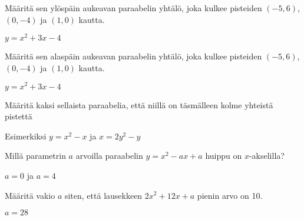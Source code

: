 \begin{tehtavasivu}
\begin{tehtava}
Määritä sen ylöspäin aukeavan paraabelin yhtälö, joka kulkee pisteiden $(-5, 6)$, $(0, -4)$ ja $(1, 0)$ kautta.
\begin{vastaus}
$y= x^2+3x-4$
\end{vastaus}
\end{tehtava}

\begin{tehtava}
Määritä sen alaspäin aukeavan paraabelin yhtälö, joka kulkee pisteiden $(-5, 6)$, $(0, -4)$ ja $(1, 0)$ kautta.
\begin{vastaus}
$y= x^2+3x-4$
\end{vastaus}
\end{tehtava}

\begin{tehtava}
Määritä kaksi sellaista paraabelia, että niillä on täsmälleen kolme yhteistä pistettä
\begin{vastaus}
Esimerkiksi $y=x^2-x$ ja  $x=2y^2-y$
\end{vastaus}
\end{tehtava}

\begin{tehtava}
Millä parametrin $a$ arvoilla paraabelin $y=x^2-ax+a$ huippu on $x$-akselilla?
\begin{vastaus}
$a=0$ ja $a=4$
\end{vastaus}
\end{tehtava}

\begin{tehtava}
Määritä vakio $a$ siten, että lausekkeen $2x^2+12x+a$ pienin arvo on 10.
\begin{vastaus}
$a=28$
\end{vastaus}
\end{tehtava}



\end{tehtavasivu}

